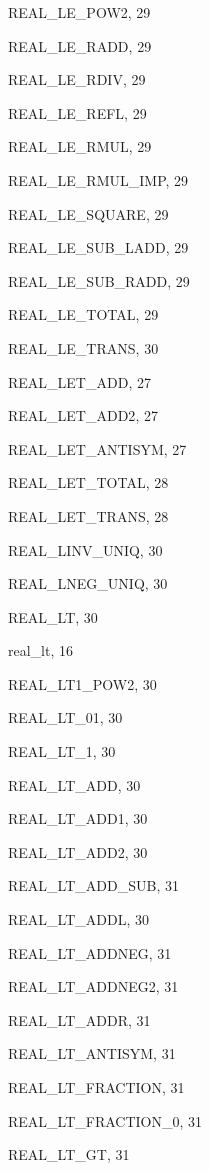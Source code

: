 \begin{theindex}
  \item {\ptt REAL\_LE\_POW2}, 29
  \item {\ptt REAL\_LE\_RADD}, 29
  \item {\ptt REAL\_LE\_RDIV}, 29
  \item {\ptt REAL\_LE\_REFL}, 29
  \item {\ptt REAL\_LE\_RMUL}, 29
  \item {\ptt REAL\_LE\_RMUL\_IMP}, 29
  \item {\ptt REAL\_LE\_SQUARE}, 29
  \item {\ptt REAL\_LE\_SUB\_LADD}, 29
  \item {\ptt REAL\_LE\_SUB\_RADD}, 29
  \item {\ptt REAL\_LE\_TOTAL}, 29
  \item {\ptt REAL\_LE\_TRANS}, 30
  \item {\ptt REAL\_LET\_ADD}, 27
  \item {\ptt REAL\_LET\_ADD2}, 27
  \item {\ptt REAL\_LET\_ANTISYM}, 27
  \item {\ptt REAL\_LET\_TOTAL}, 28
  \item {\ptt REAL\_LET\_TRANS}, 28
  \item {\ptt REAL\_LINV\_UNIQ}, 30
  \item {\ptt REAL\_LNEG\_UNIQ}, 30
  \item {\ptt REAL\_LT}, 30
  \item {\ptt real\_lt}, 16
  \item {\ptt REAL\_LT1\_POW2}, 30
  \item {\ptt REAL\_LT\_01}, 30
  \item {\ptt REAL\_LT\_1}, 30
  \item {\ptt REAL\_LT\_ADD}, 30
  \item {\ptt REAL\_LT\_ADD1}, 30
  \item {\ptt REAL\_LT\_ADD2}, 30
  \item {\ptt REAL\_LT\_ADD\_SUB}, 31
  \item {\ptt REAL\_LT\_ADDL}, 30
  \item {\ptt REAL\_LT\_ADDNEG}, 31
  \item {\ptt REAL\_LT\_ADDNEG2}, 31
  \item {\ptt REAL\_LT\_ADDR}, 31
  \item {\ptt REAL\_LT\_ANTISYM}, 31
  \item {\ptt REAL\_LT\_FRACTION}, 31
  \item {\ptt REAL\_LT\_FRACTION\_0}, 31
  \item {\ptt REAL\_LT\_GT}, 31

\end{theindex}
